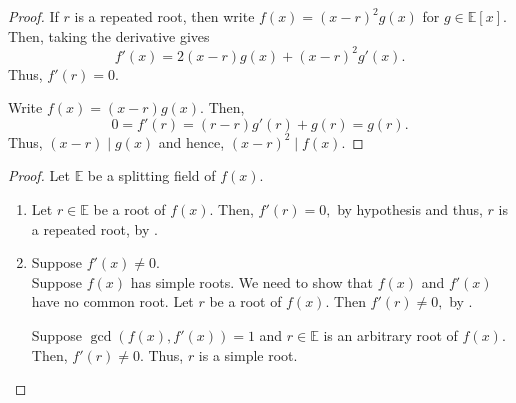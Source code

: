 \derivcritreproot*\label{prop:derivcritreproot2}
\begin{flushright}\hyperref[prop:derivcritreproot]{\upsym}\end{flushright}
\begin{proof}
    \forward If $r$ is a repeated root, then write $f(x) = (x - r)^2g(x)$ for $g \in \mathbb{E}[x].$ Then, taking the derivative gives
    \begin{equation*} 
        f'(x) = 2(x - r)g(x) + (x - r)^2g'(x).
    \end{equation*}
    Thus, $f'(r) = 0.$

    \backward Write $f(x) = (x - r)g(x).$ Then,
    \begin{equation*} 
        0 = f'(r) = (r - r)g'(r) + g(r) = g(r).
    \end{equation*}
    Thus, $(x - r) \mid g(x)$ and hence, $(x - r)^2 \mid f(x).$
\end{proof}

\derivcritsep*\label{thm:derivcritsep2}
\begin{flushright}\hyperref[thm:derivcritsep]{\upsym}\end{flushright}
\begin{proof}
    Let $\mathbb{E}$ be a splitting field of $f(x).$
    \begin{enumerate}
        \item Let $r \in \mathbb{E}$ be a root of $f(x).$ Then, $f'(r) = 0,$ by hypothesis and thus, $r$ is a repeated root, by .
        \item Suppose $f'(x) \neq 0.$\\
        \forward Suppose $f(x)$ has simple roots. We need to show that $f(x)$ and $f'(x)$ have no common root. Let $r$ be a root of $f(x).$ Then $f'(r) \neq 0,$ by .

        \backward Suppose $\gcd(f(x), f'(x)) = 1$ and $r \in \mathbb{E}$ is an arbitrary root of $f(x).$ Then, $f'(r) \neq 0.$ Thus, $r$ is a simple root. \qedhere
    \end{enumerate}
\end{proof}

